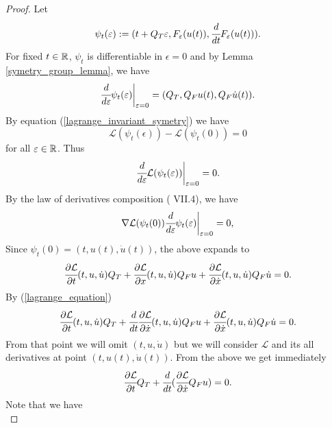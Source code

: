 \documentclass[main.tex]{subfiles}
\begin{document}
\begin{proof}
Let
\begin{equation}
    \psi_t(\epsilon) := (t + Q_T\epsilon, F_\epsilon(u(t)), \cfrac{d}{dt} F_\epsilon(u(t))).
\end{equation}
For fixed $t\in \reals$, $\psi_t$ is differentiable in $\epsilon = 0$ and by Lemma \ref{symetry_group_lemma}, we have
\begin{equation}
    \cfrac{d}{d\epsilon} \psi_t(\epsilon) \bigg\vert_{\epsilon = 0}
    = (Q_T, Q_F u(t),  Q_F \dot{u}(t)). 
\end{equation}
By equation (\ref{lagrange_invariant_symetry}) we have
\begin{equation}
    \mathcal{L}( \psi_t(\epsilon)) - \mathcal{L}(\psi_t(0)) = 0
\end{equation}
for all $\epsilon\in \reals$.
Thus
\begin{equation}
    \cfrac{d}{d\epsilon}  \mathcal{L}( \psi_t(\epsilon)) \bigg\vert_{\epsilon = 0} = 0.
\end{equation}
By the law of derivatives composition (\cite{maurin1976} VII.4), we have
\begin{equation}
    \nabla \mathcal{L}(\psi_t(0)) \cfrac{d}{d\epsilon} \psi_t(\epsilon) \bigg\vert_{\epsilon = 0} = 0,
\end{equation}
Since $\psi_t(0) = (t, u(t), \dot{u}(t))$, the above expands to
\begin{equation}
    \cfrac{\partial \mathcal{L}}{\partial t}(t, u, \dot{u})Q_T + 
    \cfrac{\partial \mathcal{L}}{\partial x}(t, u, \dot{u})Q_Fu + \cfrac{\partial \mathcal{L}}{\partial \dot{x}}(t, u, \dot{u})Q_F\dot{u} = 0.
\end{equation}
By (\ref{lagrange_equation})
\begin{equation}
    \cfrac{\partial \mathcal{L}}{\partial t}(t, u, \dot{u})Q_T + 
     \cfrac{d}{dt} \cfrac{\partial \mathcal{L}}{\partial \dot{x}}(t, u, \dot{u})Q_Fu + \cfrac{\partial \mathcal{L}}{\partial \dot{x}}(t, u, \dot{u})Q_F\dot{u} = 0.
\end{equation}
From that point we will omit $(t,u,\dot{u})$ but we will consider $\mathcal{L}$ and its all derivatives at point $(t, u(t), \dot{u}(t))$.
From the above we get immediately 
\begin{equation}
\label{almost_final}
    \cfrac{\partial \mathcal{L}}{\partial t}Q_T + 
    \cfrac{d}{dt}(\cfrac{\partial \mathcal{L}}{\partial \dot{x}} Q_Fu) = 0.
\end{equation}
Note that we have
\begin{equation}

\end{equation}
\end{proof}
\end{document}

